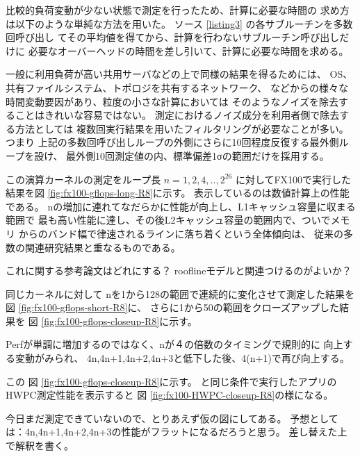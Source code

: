 \documentclass[submit,techrep,noauthor]{ipsj}
\begin{document}
比較的負荷変動が少ない状態で測定を行ったため、計算に必要な時間の
求め方は以下のような単純な方法を用いた。
ソース \lstlistingname \ref{listing3} の各サブルーチンを多数回呼び出し
てその平均値を得てから、計算を行わないサブルーチン呼び出しだけに
必要なオーバーヘッドの時間を差し引いて、計算に必要な時間を求める。

一般に利用負荷が高い共用サーバなどの上で同様の結果を得るためには、
OS、共有ファイルシステム、トポロジを共有するネットワーク、
などからの様々な時間変動要因があり、粒度の小さな計算においては
そのようなノイズを除去することはきれいな容易ではない。
測定におけるノイズ成分を利用者側で除去する方法としては
複数回実行結果を用いたフィルタリングが必要なことが多い。
つまり
上記の多数回呼び出しループの外側にさらに10回程度反復する最外側ループを設け、
最外側10回測定値の内、標準偏差1σの範囲だけを採用する。


この演算カーネルの測定をループ長
\begin{math}
n=1,2,4,..,2^{26}
\end{math}
に対してFX100で実行した結果を図 \ref{fig:fx100-gflops-long-R8}に示す。
表示しているのは数値計算上の性能である。
nの増加に連れてなだらかに性能が向上し、L1キャッシュ容量に収まる範囲で
最も高い性能に達し、その後L2キャッシュ容量の範囲内で、ついでメモリ
からのバンド幅で律速されるラインに落ち着くという全体傾向は、
従来の多数の関連研究結果と重なるものである。

{\color{blue} \par
これに関する参考論文はどれにする？
rooflineモデルと関連つけるのがよいか？
} \par

同じカーネルに対して
nを1から128の範囲で連続的に変化させて測定した結果を
図 \ref{fig:fx100-gflops-short-R8}に、
さらに1から50の範囲をクローズアップした結果を
図 \ref{fig:fx100-gflops-closeup-R8}に示す。

Perfが単調に増加するのではなく、nが４の倍数のタイミングで規則的に
向上する変動がみられ、
4n,4n+1,4n+2,4n+3と低下した後、4(n+1)で再び向上する。

この
図 \ref{fig:fx100-gflops-closeup-R8}に示す。
と同じ条件で実行したアプリのHWPC測定性能を表示すると
図 \ref{fig:fx100-HWPC-closeup-R8}の様になる。

{\color{blue} \par
今日まだ測定できていないので、とりあえず仮の図にしてある。
予想としては：4n,4n+1,4n+2,4n+3の性能がフラットになるだろうと思う。
差し替えた上で解釈を書く。

} \par
\end{document}
